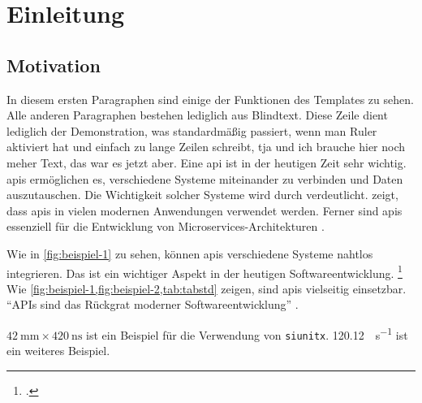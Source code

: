\section{Einleitung}
\blindtext[1]

\subsection{Motivation}

In diesem ersten Paragraphen sind einige der Funktionen des Templates zu sehen.
Alle anderen Paragraphen bestehen lediglich aus Blindtext.
Diese Zeile dient lediglich der Demonstration, was standardmäßig passiert, wenn man Ruler aktiviert hat und einfach zu lange Zeilen schreibt, tja und ich brauche hier noch meher Text, das war es jetzt aber.
Eine \gls{api} ist in der heutigen Zeit sehr wichtig.
\glspl{api} ermöglichen es, verschiedene Systeme miteinander zu verbinden und Daten auszutauschen.
Die Wichtigkeit solcher Systeme wird durch  verdeutlicht.
\textcite[7]{doe:2020} zeigt, dass \glspl{api} in vielen modernen Anwendungen verwendet werden.
Ferner sind \glspl{api} essenziell für die Entwicklung von Microservices-Architekturen \parencite[10--12]{doe:2020}.


Wie in \cref{fig:beispiel-1} zu sehen, können \glspl{api} verschiedene Systeme nahtlos integrieren.
Das ist ein wichtiger Aspekt in der heutigen Softwareentwicklung.
\footcite[25]{doe:2020}
Wie \cref{fig:beispiel-1,fig:beispiel-2,tab:tabstd} zeigen, sind \glspl{api} vielseitig einsetzbar.
\enquote{APIs sind das Rückgrat moderner Softwareentwicklung}
\parencite[15]{doe:2020}.

$\qty{42}{\milli\meter} \times \qty{420}{\nano\second}$ ist ein Beispiel für die Verwendung von \texttt{siunitx}.
\qty{120.12}{\request\per\second} ist ein weiteres Beispiel.